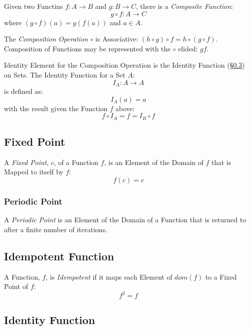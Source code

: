 Given two Functins $f : A \rightarrow B$ and $g : B \rightarrow C$,
there is a \emph{Composite Function}:
\[
  g \circ f : A \rightarrow C
\]
where $(g \circ f)(a) = g(f(a))$ and $a \in A$.

The \emph{Composition Operation} $\circ$ is Associative: $(h \circ g)
\circ f = h \circ (g \circ f)$. Composition of Functions may be
represented with the $\circ$ elided: $gf$.

Identity Element for the Composition Operation is the Identity
Function (\S\ref{sec:identity_function}) on Sets. The Identity
Function for a Set $A$:
\[
  I_A : A \rightarrow A
\]
is defined as:
\[
  I_A(a) = a
\]
with the result given the Function $f$ above:
\[
  f \circ I_A = f = I_B \circ f
\]



\subsection{Fixed Point}\label{sec:fixed_point}

A \emph{Fixed Point}, $c$, of a Function $f$, is an Element of the
Domain of $f$ that is Mapped to itself by $f$:
\[
  f(c) = c
\]



\subsubsection{Periodic Point}\label{sec:periodic_point}

A \emph{Periodic Point} is an Element of the Domain of a Function that
is returned to after a finite number of iterations.



\subsection{Idempotent Function}\label{sec:idempotent}

A Function, $f$, is \emph{Idempotent} if it maps each Element of
$dom(f)$ to a Fixed Point of $f$:
\[
  f^2 = f
\]



\subsection{Identity Function}\label{sec:identity_function}

